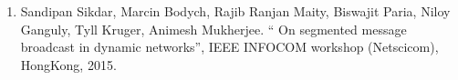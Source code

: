 \begin{enumerate}
   \item  Sandipan Sikdar, Marcin Bodych, Rajib Ranjan Maity, Biswajit Paria, Niloy Ganguly, Tyll Kruger, Animesh Mukherjee. `` On segmented message broadcast 
   in dynamic networks'', IEEE INFOCOM workshop (Netscicom), HongKong, 2015.
\end{enumerate}

